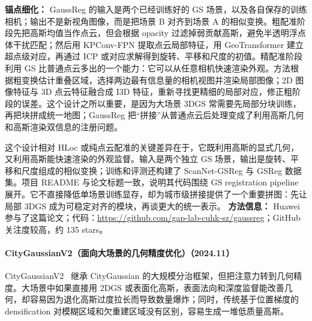 \textbf{锚点细化：} GaussReg 的输入是两个已经训练好的 GS 场景，以及各自保存的训练相机；输出不是新视角图像，而是把场景 B 对齐到场景 A 的相似变换。粗配准阶段先把高斯均值当作点云，但会根据 opacity 过滤掉弱贡献高斯，避免半透明浮点体干扰匹配；然后用 KPConv-FPN 提取点云局部特征，用 GeoTransformer 建立超点级对应，再通过 ICP 或对应求解得到旋转、平移和尺度的初值。精配准阶段利用 GS 比普通点云多出的一个能力：它可以从任意相机快速渲染外观。方法根据粗变换估计重叠区域，选择两边最有信息量的相机视图并渲染局部图像；2D 图像特征与 3D 点云特征融合成 I3D 特征，重新寻找更精细的局部对应，修正粗阶段的误差。这个设计之所以重要，是因为大场景 3DGS 常需要先局部分块训练，再把块拼成统一地图；GaussReg 把“拼接”从普通点云后处理变成了利用高斯几何和高斯渲染双信息的注册问题。

这个设计相对 HLoc 或纯点云配准的关键差异在于，它既利用高斯的显式几何，又利用高斯能快速渲染的外观监督。输入是两个独立 GS 场景，输出是旋转、平移和尺度组成的相似变换；训练和评测还构建了 ScanNet-GSReg 与 GSReg 数据集。项目 README 与论文标题一致，说明其代码围绕 GS registration pipeline 展开。它不直接降低单场景训练显存，却为城市级拼接提供了一个重要拼图：先让局部 3DGS 成为可稳定对齐的模块，再谈更大的统一表示。
\textbf{方法信息：} Huawei 参与了这篇论文；代码：\url{https://github.com/gap-lab-cuhk-sz/gaussreg}；GitHub 关注度较高，约 135 stars。



\paragraph{CityGaussianV2（面向大场景的几何精度优化）（2024.11）}
CityGaussianV2~\cite{2411_00771} 继承 CityGaussian 的大规模分治框架，但把注意力转到几何精度。大场景中如果直接用 2DGS 或表面化高斯，表面法向和深度监督能改善几何，却容易因为退化高斯过度拉长而导致数量爆炸；同时，传统基于位置梯度的 densification 对模糊区域和欠重建区域没有区别，容易生成一堆低质量高斯。

